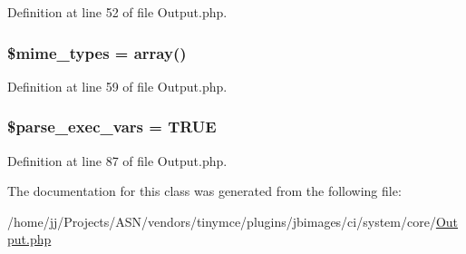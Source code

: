 Definition at line 52 of file Output.\+php.

\subsubsection[{\texorpdfstring{\$mime\+\_\+types}{$mime_types}}]{\setlength{\rightskip}{0pt plus 5cm}\$mime\+\_\+types = array()\hspace{0.3cm}{\ttfamily [protected]}}\hypertarget{class_c_i___output_a49932ececf6da03a6379ca46ca1604d4}{}\label{class_c_i___output_a49932ececf6da03a6379ca46ca1604d4}


Definition at line 59 of file Output.\+php.

\subsubsection[{\texorpdfstring{\$parse\+\_\+exec\+\_\+vars}{$parse_exec_vars}}]{\setlength{\rightskip}{0pt plus 5cm}\$parse\+\_\+exec\+\_\+vars = T\+R\+UE\hspace{0.3cm}{\ttfamily [protected]}}\hypertarget{class_c_i___output_a254d73d122352494697cdba0c509086d}{}\label{class_c_i___output_a254d73d122352494697cdba0c509086d}


Definition at line 87 of file Output.\+php.



The documentation for this class was generated from the following file\+:\begin{DoxyCompactItemize}
\item 
/home/jj/\+Projects/\+A\+S\+N/vendors/tinymce/plugins/jbimages/ci/system/core/\hyperlink{_output_8php}{Output.\+php}\end{DoxyCompactItemize}
